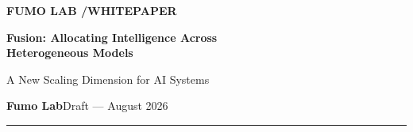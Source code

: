 \documentclass[11pt,a4paper,parskip=half,headings=normal]{scrartcl}
\begin{document}
\thispagestyle{empty}
\begin{flushleft}
{\sffamily\small\bfseries\color{fusionblue}FUMO LAB \enspace/\enspace WHITEPAPER}\par
\vspace{1.4cm}
{\sffamily\fontsize{27}{31}\selectfont\bfseries\color{fusionink}
Fusion: Allocating Intelligence Across\\[0.14em]
Heterogeneous Models}\par
\vspace{0.5cm}
{\sffamily\fontsize{16}{20}\selectfont\color{fusiongray}
A New Scaling Dimension for AI Systems}\par
\vspace{0.9cm}
{\sffamily\small\color{fusiongray}
\textbf{Fumo Lab}\hfill Draft --- August 2026}\par
\vspace{0.45cm}
{\color{fusionblue}\rule{\textwidth}{1.2pt}}
\end{flushleft}
\end{document}
